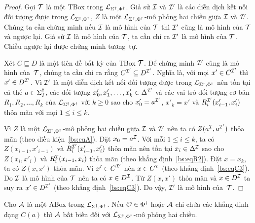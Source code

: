 \begin{proof}
	Gọi $\mathcal{T}$ là một TBox trong $\mathcal{L}_{\Sigma^\dag,\Phi^\dag}$. Giả sử $\mathcal{I}$ và $\mathcal{I}'$ là các diễn dịch kết nối đối tượng được trong $\mathcal{L}_{\Sigma^\dag,\Phi^\dag}$, $Z$ là một $\mathcal{L}_{\Sigma^\dag,\Phi^\dag}$-mô phỏng hai chiều giữa $\mathcal{I}$ và $\mathcal{I}'$. Chúng ta cần chứng minh nếu $\mathcal{I}$ là mô hình của $\mathcal{T}$ thì $\mathcal{I}'$ cũng là mô hình của $\mathcal{T}$ và ngược lại. Giả sử $\mathcal{I}$ là mô hình của $\mathcal{T}$, ta cần chỉ ra $\mathcal{I}'$ là mô hình của $\mathcal{T}$. Chiều ngược lại được chứng minh tương~tự.
	
	Xét $C \sqsubseteq D$ là một tiên đề bất kỳ của TBox $\mathcal{T}$. Để chứng minh $\mathcal{I}'$ cũng là mô hình của~$\mathcal{T}$, chúng ta cần chỉ ra rằng $C^{\mathcal{I}'} \subseteq D^{\mathcal{I}'}$. Nghĩa là, với mọi $x' \in C^{\mathcal{I}'}$ thì $x' \in D^{\mathcal{I}'}$. Vì $\mathcal{I}'$ là một diễn dịch kết nối đối tượng được trong $\mathcal{L}_{\Sigma^\dag,\Phi^\dag}$ nên tồn tại cá thể $a \in \Sigma^\dag_I$, các đối tượng $x'_0, x'_1, \ldots, x'_k \in \Delta^{\mathcal{I}'}$ và các vai trò đối tượng cơ bản $R_1, R_2, \ldots, R_k$ của $\mathcal{L}_{\Sigma^\dag,\Phi^\dag}$ với $k \geq 0$ sao cho $x'_0 = a^{\mathcal{I}'}$, $x'_k = x'$ và $R_i^{\mathcal{I}'}(x'_{i-1}, x'_i)$ thỏa mãn với mọi $1 \leq i \leq k$.
	
	Vì $Z$ là một $\mathcal{L}_{\Sigma^\dag,\Phi^\dag}$-mô phỏng hai chiều giữa $\mathcal{I}$ và $\mathcal{I}'$ nên ta có $Z(a^{\mathcal{I}}, a^{\mathcal{I}'})$ thỏa mãn (theo điều kiện~\eqref{bs:eqA}). Đặt $x_0 = a^{\mathcal{I}}$. Với mỗi $1 \leq i \leq k$, ta có $Z(x_{i-1},x'_{i-1})$ và $R_i^{\mathcal{I}'}(x'_{i-1},x'_i)$ thỏa mãn nên tồn tại $x_i \in \Delta^{\mathcal{I}}$ sao cho $Z(x_i, x'_i)$ và $R_i^{\mathcal{I}}(x_{i-1}, x_i)$ thỏa mãn (theo khẳng định~\eqref{bs:eqR2}). Đặt $x=x_k$, ta có $Z(x,x')$ thỏa mãn. Vì $x' \in C^{\mathcal{I}'}$ nên $x \in C^{\mathcal{I}}$ (theo khẳng định~\eqref{bs:eqC3}). Do $\mathcal{I}$ là mô hình của $\mathcal{T}$ nên ta có $x \in D^{\mathcal{I}}$. Từ $Z(x, x')$ thỏa mãn và $x \in D^{\mathcal{I}}$ ta suy ra $x' \in D^{\mathcal{I}'}$ (theo khẳng định~\eqref{bs:eqC3}). Do vậy, $\mathcal{I}'$ là mô hình của~$\mathcal{T}$.
\end{proof}

\begin{Theorem}
\label{th:ABoxInvariant}
	Cho $\mathcal{A}$ là một ABox trong $\mathcal{L}_{\Sigma^\dag,\Phi^\dag}$. Nếu $\mathcal{O} \in \Phi^\dag$ hoặc $\mathcal{A}$ chỉ chứa các khẳng định dạng $C(a)$ thì $\mathcal{A}$ bất biến đối với $\mathcal{L}_{\Sigma^\dag,\Phi^\dag}$-mô phỏng hai chiều.
\end{Theorem}

